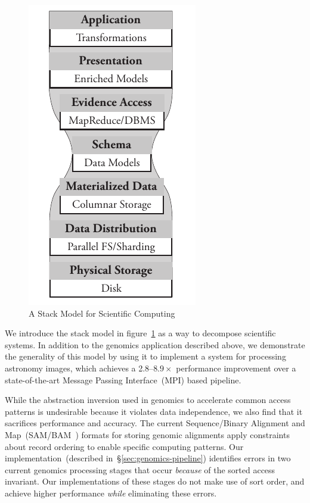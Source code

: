 \documentclass[10pt]{report} %
\begin{document}
\begin{figure}[h]
\begin{center}
\includegraphics[width=0.6\linewidth]{stack-model.pdf}
\end{center}
\caption{A Stack Model for Scientific Computing}
\label{fig:stack-model}
\end{figure}

We introduce the stack model in figure~\ref{fig:stack-model} as a way to decompose scientific systems. In
addition to the genomics application described above, we demonstrate the generality of this model by using it to
implement a system for processing astronomy images, which achieves a 2.8--$8.9\times$ performance
improvement over a state-of-the-art Message Passing Interface~(MPI) based pipeline.

While the abstraction inversion used in genomics to accelerate common access patterns is undesirable
because it violates data independence, we also find that it sacrifices performance and
accuracy. The current Sequence/Binary Alignment and Map~(SAM/BAM~\cite{li09}) formats for storing
genomic alignments apply constraints about record ordering to enable specific computing patterns. Our
implementation~(described in~\S\ref{sec:genomics-pipeline}) identifies errors in two current genomics
processing stages that occur \emph{because} of the sorted access invariant. Our implementations of
these stages do not make use of sort order, and achieve higher performance \emph{while} eliminating
these errors.
\end{document}
